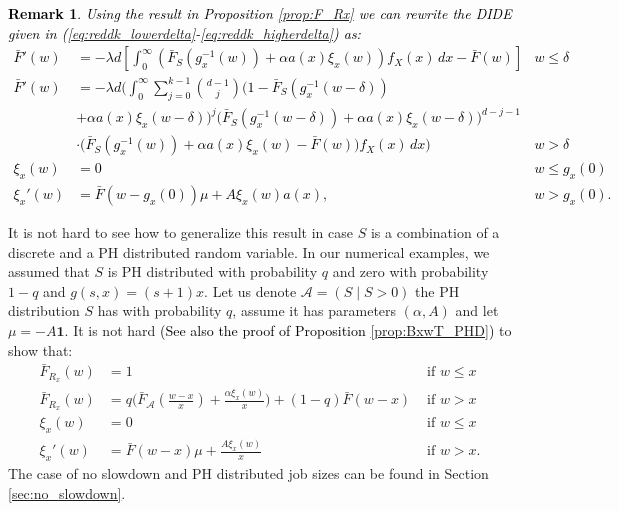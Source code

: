 \documentclass[12pt]{report}
\newtheorem{remark}{Remark}
\begin{document}
\textcolor{black}{
\begin{remark}
Using the result in Proposition \ref{prop:F_Rx} we can rewrite the DIDE given in (\ref{eq:reddk_lowerdelta}-\ref{eq:reddk_higherdelta}) as:
\begin{align*}
\bar F'(w)
&=
-\lambda d \left[\int_0^{\infty} \left( \bar F_S(g_x^{-1}(w))+\alpha a(x) \xi_x(w) \right) f_X(x) \, dx - \bar F(w)\right] & w \leq \delta\\
\bar F'(w)
&=
-\lambda d \bigg( \int_0^\infty \sum_{j=0}^{k-1} \binom{d-1}{j} \bigg(1-\bar F_S(g_x^{-1}(w-\delta))\\
&+\alpha a(x) \xi_x(w-\delta)\bigg)^j \big(\bar F_S(g_x^{-1}(w-\delta))+\alpha a(x) \xi_x(w-\delta)\big)^{d-j-1}\\
& \cdot \bigg( \bar F_S(g_x^{-1}(w))+\alpha a(x) \xi_x(w) - \bar F(w) \bigg) f_X(x) \, dx \bigg) & w>\delta\\
\xi_x(w)&=0& w \leq g_x(0) \\
\xi_x'(w)&=\bar F(w-g_x(0)) \mu + A \xi_x(w) a(x), & w > g_x(0).
\end{align*}
\end{remark}
}
It is not hard to see how to generalize this result in case $S$ is a combination of a discrete and 
a PH distributed random variable.
In our numerical examples, we assumed that $S$ is PH distributed with probability $q$ and zero with probability $1-q$ and $g(s,x)=(s+1)x$. Let us denote $\mathcal{A}=(S\mid S>0)$ the PH distribution $S$ has with probability $q$, assume it has parameters $(\alpha,A)$ and let $\mu=-A\textbf{1}$. It is not hard \textcolor{black}{(See also the proof of Proposition \ref{prop:BxwT_PHD})} to show that:
\begin{align*}
\bar F_{R_x}(w)&=1&\mbox{ if } w \leq x\\
\bar F_{R_x}(w)&=q \bigg( \bar F_{\mathcal{A}}\left(\frac{w-x}{x}\right) +  \frac{\alpha\xi_x(w)}{x} \bigg) + (1-q) \bar F(w-x) & \mbox{ if } w >x\\
\xi_x(w)&=0 & \mbox{ if } w \leq x\\
\xi_x'(w)&=\bar F(w-x) \mu + \frac{A \xi_x(w)}{x} & \mbox{ if } w > x.
\end{align*}
The case of no slowdown and PH distributed job sizes can be found in Section \ref{sec:no_slowdown}.
\end{document}
